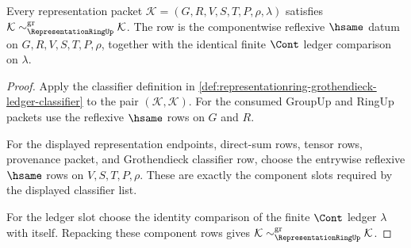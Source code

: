 \begin{theorem}
\label{thm:representationring-grothendieck-classifier-reflexive}
Every representation packet
$\mathcal{K}=(G,R,V,S,T,P,\rho,\lambda)$ satisfies
$\mathcal{K}\sim_{\RepresentationRingUp}^{\mathrm{gr}}\mathcal{K}$. The row is
the componentwise reflexive $\hsame$ datum on $G,R,V,S,T,P,\rho$, together
with the identical finite $\Cont$ ledger comparison on $\lambda$.
\end{theorem}
\begin{proof}
Apply the classifier definition in
\autoref{def:representationring-grothendieck-ledger-classifier} to the pair
$(\mathcal{K},\mathcal{K})$. For the consumed GroupUp and RingUp packets use
the reflexive $\hsame$ rows on $G$ and $R$.

For the displayed representation endpoints, direct-sum rows, tensor rows,
provenance packet, and Grothendieck classifier row, choose the entrywise
reflexive $\hsame$ rows on $V,S,T,P,\rho$. These are exactly the component
slots required by the displayed classifier list.

For the ledger slot choose the identity comparison of the finite $\Cont$
ledger $\lambda$ with itself. Repacking these component rows gives
$\mathcal{K}\sim_{\RepresentationRingUp}^{\mathrm{gr}}\mathcal{K}$.
\end{proof}


